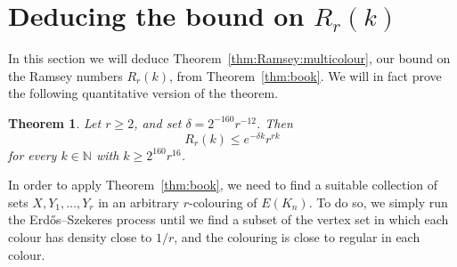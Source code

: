 \documentclass[12pt,reqno]{amsart}
\newtheorem{theorem}{Theorem}[section]
\theoremstyle{definition}
\theoremstyle{remark}
\newcommand\N{\mathbb{N}}
\renewcommand{\le}{\leqslant}
\renewcommand{\ge}{\geqslant}
\def\N{\mathbb{N}}
\begin{document}
\section{Deducing the bound on \(R_r(k)\)}\label{sec:final:proof}

In this section we will deduce Theorem~\ref{thm:Ramsey:multicolour}, our bound on the Ramsey numbers \(R_r(k)\), from Theorem~\ref{thm:book}. We will in fact prove the following quantitative version of the theorem.

%
\begin{theorem}
	\label{thm:Ramsey:multicolour:quant}
	Let \(r \ge 2\), and set \(\delta = 2^{-160} r^{-12}\). Then
	\begin{equation*}
		R_r(k) \le e^{-\delta k} r^{rk}
	\end{equation*}
	for every \(k \in \N\) with \(k \ge 2^{160} r^{16}\).
\end{theorem}
%

In order to apply Theorem~\ref{thm:book}, we need to find a suitable collection of sets \(X,Y_1,\ldots,Y_r\) in an arbitrary \(r\)-colouring of \(E(K_n)\). To do so, we simply run the Erd\H{o}s--Szekeres process until we find a subset of the vertex set in which each colour has density close to \(1/r\), and the colouring is close to regular in each colour.
\end{document}
